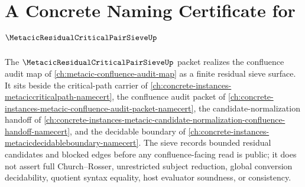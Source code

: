 \chapter{A Concrete Naming Certificate for $\MetacicResidualCriticalPairSieveUp$}
\label{ch:concrete-instances-metacic-residual-critical-pair-sieve-namecert}

The $\MetacicResidualCriticalPairSieveUp$ packet realizes the confluence audit map of \autoref{ch:metacic-confluence-audit-map} as a finite residual sieve surface. It sits beside the critical-path carrier of \autoref{ch:concrete-instances-metaciccriticalpath-namecert}, the confluence audit packet of \autoref{ch:concrete-instances-metacic-confluence-audit-packet-namecert}, the candidate-normalization handoff of \autoref{ch:concrete-instances-metacic-candidate-normalization-confluence-handoff-namecert}, and the decidable boundary of \autoref{ch:concrete-instances-metacicdecidableboundary-namecert}. The sieve records bounded residual candidates and blocked edges before any confluence-facing read is public; it does not assert full Church--Rosser, unrestricted subject reduction, global conversion decidability, quotient syntax equality, host evaluator soundness, or consistency.

